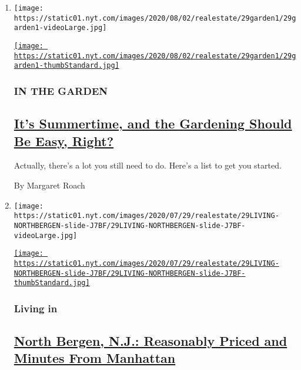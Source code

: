 \begin{enumerate}
\def\labelenumi{\arabic{enumi}.}
\item
  \texttt{[image: https://static01.nyt.com/images/2020/08/02/realestate/29garden1/29garden1-videoLarge.jpg]}

  \href{/2020/07/29/realestate/garden-summer-august-chores.html}{\texttt{[image: https://static01.nyt.com/images/2020/08/02/realestate/29garden1/29garden1-thumbStandard.jpg]}}

  \hypertarget{in-the-garden}{%
  \subsubsection{IN THE GARDEN}\label{in-the-garden}}

  \hypertarget{its-summertime-and-the-gardening-should-be-easy-right}{%
  \subsection{\texorpdfstring{\href{/2020/07/29/realestate/garden-summer-august-chores.html}{It's
  Summertime, and the Gardening Should Be Easy,
  Right?}}{It's Summertime, and the Gardening Should Be Easy, Right?}}\label{its-summertime-and-the-gardening-should-be-easy-right}}

  Actually, there's a lot you still need to do. Here's a list to get you
  started.

  By Margaret Roach
\item
  \texttt{[image: https://static01.nyt.com/images/2020/07/29/realestate/29LIVING-NORTHBERGEN-slide-J7BF/29LIVING-NORTHBERGEN-slide-J7BF-videoLarge.jpg]}

  \href{/2020/07/29/realestate/north-bergen-nj-reasonably-priced-and-minutes-from-manhattan.html}{\texttt{[image: https://static01.nyt.com/images/2020/07/29/realestate/29LIVING-NORTHBERGEN-slide-J7BF/29LIVING-NORTHBERGEN-slide-J7BF-thumbStandard.jpg]}}

  \hypertarget{living-in}{%
  \subsubsection{Living in}\label{living-in}}

  \hypertarget{north-bergen-nj-reasonably-priced-and-minutes-from-manhattan}{%
  \subsection{\texorpdfstring{\href{/2020/07/29/realestate/north-bergen-nj-reasonably-priced-and-minutes-from-manhattan.html}{North
  Bergen, N.J.: Reasonably Priced and Minutes From
  Manhattan}}{North Bergen, N.J.: Reasonably Priced and Minutes From Manhattan}}\label{north-bergen-nj-reasonably-priced-and-minutes-from-manhattan}}


\end{enumerate}
